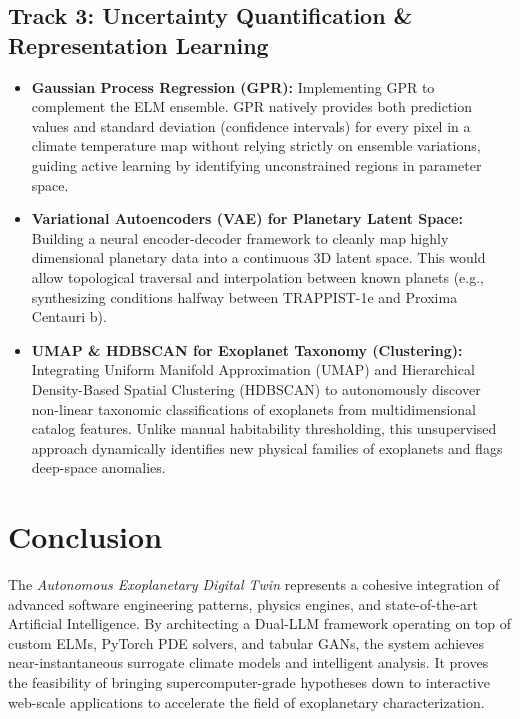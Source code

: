 \documentclass[12pt,a4paper]{article}
\begin{document}
\subsection{Track 3: Uncertainty Quantification \& Representation Learning}
\begin{itemize}
    \item \textbf{Gaussian Process Regression (GPR):} Implementing GPR to complement the ELM ensemble. GPR natively provides both prediction values and standard deviation (confidence intervals) for every pixel in a climate temperature map without relying strictly on ensemble variations, guiding active learning by identifying unconstrained regions in parameter space.
    \item \textbf{Variational Autoencoders (VAE) for Planetary Latent Space:} Building a neural encoder-decoder framework to cleanly map highly dimensional planetary data into a continuous 3D latent space. This would allow topological traversal and interpolation between known planets (e.g., synthesizing conditions halfway between TRAPPIST-1e and Proxima Centauri b).
    \item \textbf{UMAP \& HDBSCAN for Exoplanet Taxonomy (Clustering):} Integrating Uniform Manifold Approximation (UMAP) and Hierarchical Density-Based Spatial Clustering (HDBSCAN) to autonomously discover non-linear taxonomic classifications of exoplanets from multidimensional catalog features. Unlike manual habitability thresholding, this unsupervised approach dynamically identifies new physical families of exoplanets and flags deep-space anomalies.
\end{itemize}

\section{Conclusion}
The \textit{Autonomous Exoplanetary Digital Twin} represents a cohesive integration of advanced software engineering patterns, physics engines, and state-of-the-art Artificial Intelligence. By architecting a Dual-LLM framework operating on top of custom ELMs, PyTorch PDE solvers, and tabular GANs, the system achieves near-instantaneous surrogate climate models and intelligent analysis. It proves the feasibility of bringing supercomputer-grade hypotheses down to interactive web-scale applications to accelerate the field of exoplanetary characterization.
\end{document}
